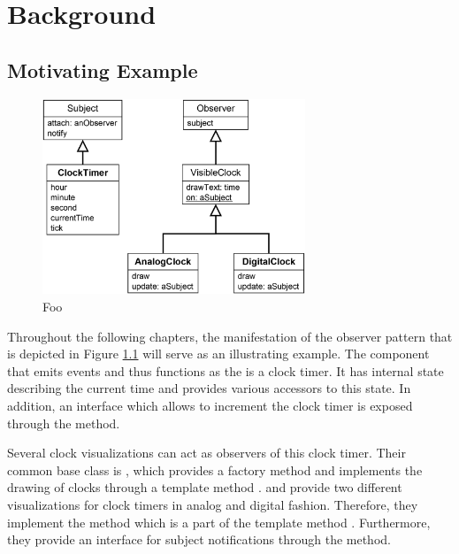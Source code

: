 \chapter{Background}
\label{c:Background}

\section{Motivating Example}
\label{s:BackgroundExample}

\begin{figure}[tb]
	\centering
	\includegraphics[width=0.7\textwidth]{../images/02-ObserverExample}
	\caption[foo]{Foo}
	\label{fig:BackgroundExample}
\end{figure}

Throughout the following chapters, the manifestation of the observer pattern \cite{gamma_design_1995} that is depicted in Figure \ref{fig:BackgroundExample} will serve as an illustrating example.
The component that emits events and thus functions as the  is a clock timer.
It has internal state describing the current time and provides various accessors to this state.
In addition, an interface which allows to increment the clock timer is exposed through the  method.

Several clock visualizations can act as observers of this clock timer.
Their common base class is , which provides a factory method \cite{gamma_design_1995} and implements the drawing of clocks through a template method \cite{gamma_design_1995}.
 and  provide two different visualizations for clock timers in analog and digital fashion.
Therefore, they implement the  method which is a part of the template method .
Furthermore, they provide an interface for subject notifications through the  method.

